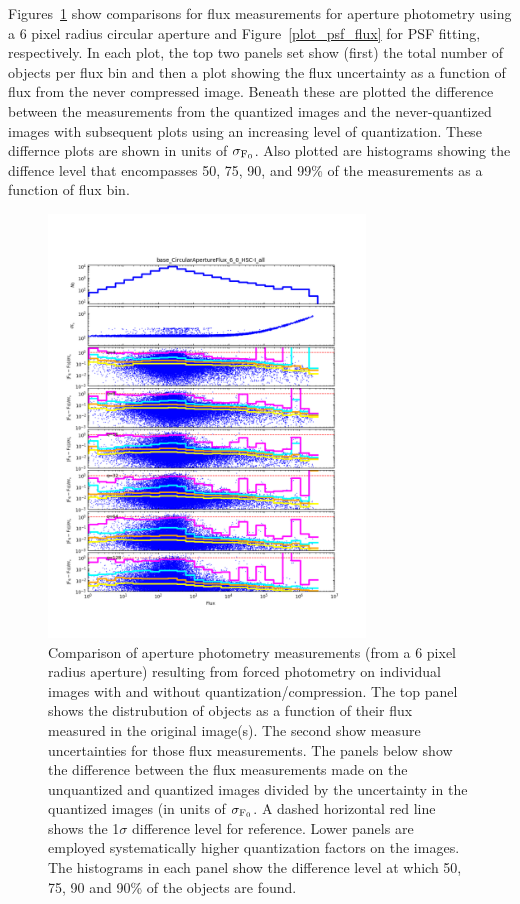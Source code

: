 Figures~\ref{plot_app_flux} show comparisons for flux measurements for aperture photometry 
using a 6 pixel radius circular aperture and Figure~\ref{plot_psf_flux} for PSF fitting, respectively.
In each plot, the top two panels set show (first) the total number of objects 
per flux bin and then a plot showing the flux uncertainty as a function of flux from the never compressed image.  
Beneath these are plotted the difference between the measurements from the quantized images and the never-quantized 
images with subsequent plots using an increasing level of quantization.  These differnce plots are shown in units of
$\sigma_{\rm F_0}$.  Also plotted are histograms showing the diffence level that encompasses 50, 75, 90, and 99\% of the 
measurements as a function of flux bin.

\begin{figure}
\centering
\includegraphics[width=0.75\textwidth]{figure/rplot_all_base_CircularApertureFlux_6_0_HSC-I.png}
\caption{Comparison of aperture photometry measurements (from a 6 pixel radius aperture) resulting from forced photometry 
on individual images with and without quantization/compression.
The top panel shows the distrubution of objects as a function of their flux measured in the original image(s).  The second show 
measure uncertainties for those flux measurements.  The panels below show the difference between the flux measurements made on the
unquantized and quantized images divided by the uncertainty in the quantized images (in units of $\sigma_{\rm F_0}$.  A dashed horizontal 
red line shows the 1$\sigma$ difference level for reference.  Lower panels are employed systematically higher quantization factors on the
images.  The histograms in each panel show the difference level at which 50, 75, 90 and 90\% of the objects are found.}
\label{plot_app_flux}
\end{figure}

